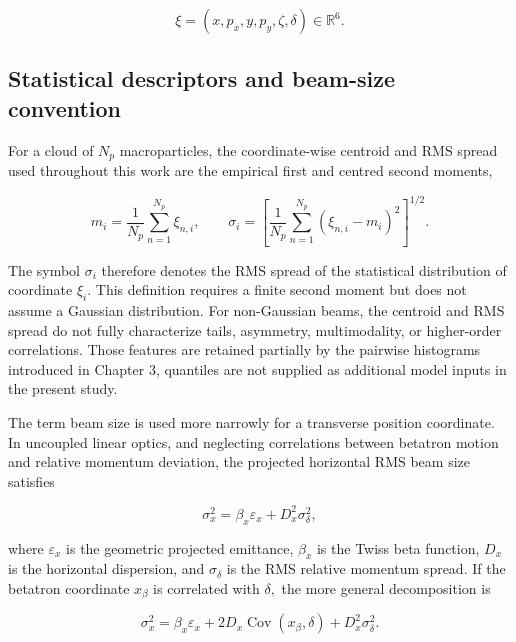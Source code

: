 \begin{equation}
\label{eq:25}
\xi=(x,p_x,y,p_y,\zeta,\delta)\in\mathbb{R}^6.
\end{equation}

\subsection{Statistical descriptors and beam-size convention}
\label{sec:02_beam_dynamics_statistical_descriptors_and_beam_size_convention}

For a cloud of \(N_{p}\) macroparticles, the coordinate-wise centroid and RMS spread used throughout this work are the empirical first and centred second moments,

\begin{equation}
\label{eq:26}
m_i=\frac1{N_p}\sum_{n=1}^{N_p}\xi_{n,i},\qquad\sigma_i=\left[\frac1{N_p}\sum_{n=1}^{N_p}(\xi_{n,i}-m_i)^2\right]^{1/2}.
\end{equation}

The symbol \(\sigma_{i}\) therefore denotes the RMS spread of the statistical distribution of coordinate \(\xi_{i} .\) This definition requires a finite second moment but does not assume a Gaussian distribution. For non-Gaussian beams, the centroid and RMS spread do not fully characterize tails, asymmetry, multimodality, or higher-order correlations. Those features are retained partially by the pairwise histograms introduced in Chapter 3, quantiles are not supplied as additional model inputs in the present study.

The term beam size is used more narrowly for a transverse position coordinate. In uncoupled linear optics, and neglecting correlations between betatron motion and relative momentum deviation, the projected horizontal RMS beam size satisfies

\begin{equation}
\label{eq:27}
\sigma_x^2=\beta_x\varepsilon_x+D_x^2\sigma_{\delta}^2,
\end{equation}

where \(\varepsilon_{x}\) is the geometric projected emittance, \(\beta_{x}\) is the Twiss beta function, \(D_{x}\) is the horizontal dispersion, and \(\sigma_{\delta}\) is the RMS relative momentum spread. If the betatron coordinate \(x_{\beta}\) is correlated with \(\delta ,\) the more general decomposition is

\begin{equation}
\label{eq:28}
\sigma_x^2=\beta_x\varepsilon_x+2D_x\operatorname{Cov}(x_{\beta},\delta)+D_x^2\sigma_{\delta}^2.
\end{equation}

